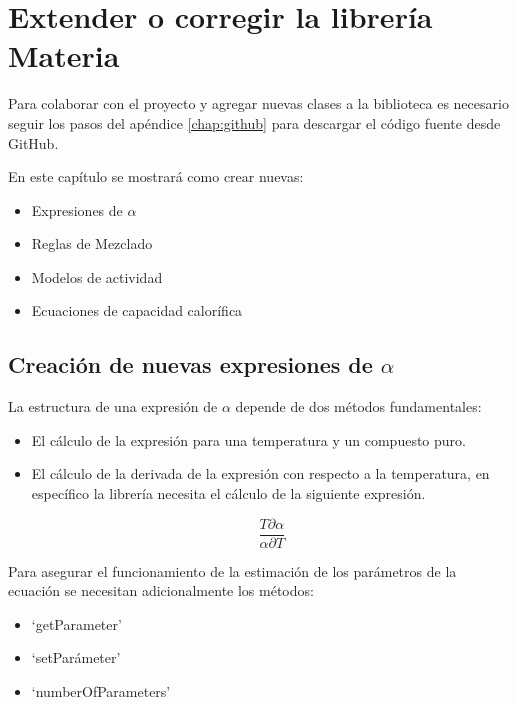 \chapter{Extender o corregir la librería Materia}\label{chap:libraryExtension}

	Para colaborar con el proyecto \Materia y agregar nuevas clases a la biblioteca es necesario seguir los pasos del apéndice \ref{chap:github} para descargar el código fuente desde GitHub.	
	
 	En este capítulo se mostrará como crear nuevas:

 	\begin{itemize}\itemsep0ex
 		\item{Expresiones de $\alpha$}
 		\item{Reglas de Mezclado}
 		\item{Modelos de actividad} 		
 		\item{Ecuaciones de capacidad calorífica} 		
 	\end{itemize}

 
 	\section{Creación de nuevas expresiones de $\alpha$}\label{sec:newAlphaExpressions}

 	La estructura de una expresión de $\alpha$ depende de dos métodos fundamentales: 

 		\begin{itemize}\itemsep0ex
 			\item El cálculo de la expresión para una temperatura y un compuesto puro.
 			\item El cálculo de la derivada de la expresión con respecto a la temperatura, en específico la librería necesita el cálculo de la siguiente expresión.

 			\begin{equation}
 				\frac{T \partial \alpha}{\alpha \partial T}
 			\end{equation}
 		\end{itemize}

 	Para asegurar el funcionamiento de la estimación de los parámetros de la ecuación se necesitan adicionalmente los métodos:
 		\begin{itemize}\itemsep0ex
 			\item `getParameter'
 			\item `setParámeter'
 			\item `numberOfParameters'
 		\end{itemize}

